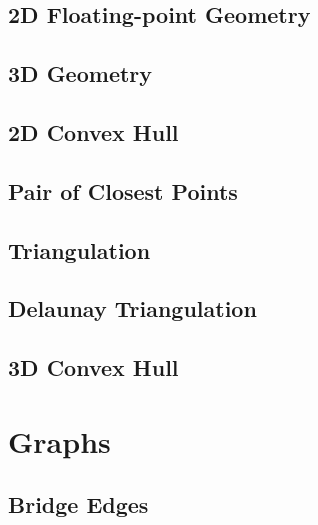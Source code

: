 \subsection{2D Floating-point Geometry}
\raggedbottom
\hrulefill
\subsection{3D Geometry}
\raggedbottom
\hrulefill
\subsection{2D Convex Hull}
\raggedbottom
\hrulefill
\subsection{Pair of Closest Points}
\raggedbottom
\hrulefill
\subsection{Triangulation}
\raggedbottom
\hrulefill
\subsection{Delaunay Triangulation}
\raggedbottom
\hrulefill
\subsection{3D Convex Hull}
\raggedbottom
\hrulefill

\section{Graphs}
\subsection{Bridge Edges}
\raggedbottom
\hrulefill
